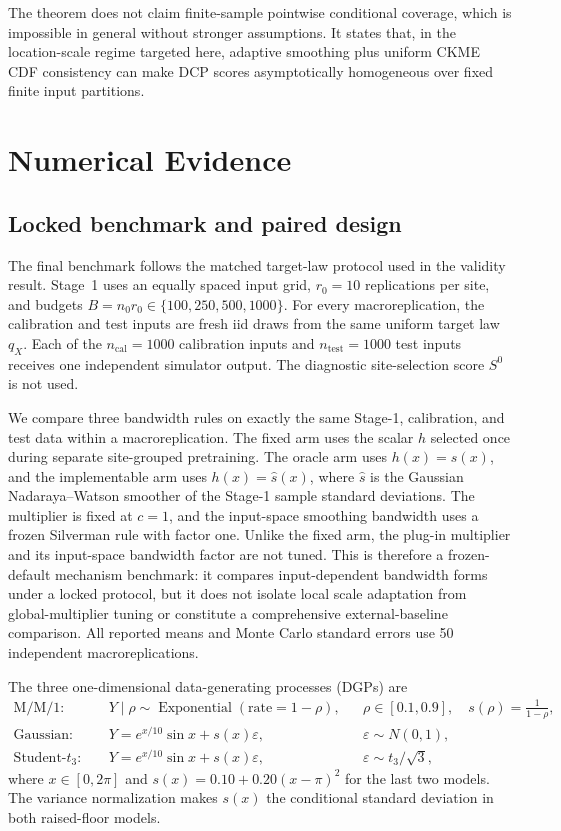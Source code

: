 \documentclass[11pt]{article}
\newif\ifincludeexperiments
\begin{document}
The theorem does not claim finite-sample pointwise conditional coverage, which is impossible in general without stronger assumptions. It states that, in the location-scale regime targeted here, adaptive smoothing plus uniform CKME CDF consistency can make DCP scores asymptotically homogeneous over fixed finite input partitions.

\ifincludeexperiments
\section{Numerical Evidence}
\label{sec:experiments}

\subsection{Locked benchmark and paired design}

The final benchmark follows the matched target-law protocol used in the validity result. Stage~1 uses an equally spaced input grid, \(r_0=10\) replications per site, and budgets \(B=n_0r_0\in\{100,250,500,1000\}\). For every macroreplication, the calibration and test inputs are fresh iid draws from the same uniform target law \(q_X\). Each of the \(n_{\mathrm{cal}}=1000\) calibration inputs and \(n_{\mathrm{test}}=1000\) test inputs receives one independent simulator output. The diagnostic site-selection score \(S^0\) is not used.

We compare three bandwidth rules on exactly the same Stage-1, calibration, and test data within a macroreplication. The fixed arm uses the scalar \(h\) selected once during separate site-grouped pretraining. The oracle arm uses \(h(x)=s(x)\), and the implementable arm uses \(h(x)=\widehat s(x)\), where \(\widehat s\) is the Gaussian Nadaraya--Watson smoother of the Stage-1 sample standard deviations. The multiplier is fixed at \(c=1\), and the input-space smoothing bandwidth uses a frozen Silverman rule with factor one. Unlike the fixed arm, the plug-in multiplier and its input-space bandwidth factor are not tuned. This is therefore a frozen-default mechanism benchmark: it compares input-dependent bandwidth forms under a locked protocol, but it does not isolate local scale adaptation from global-multiplier tuning or constitute a comprehensive external-baseline comparison. All reported means and Monte Carlo standard errors use 50 independent macroreplications.

The three one-dimensional data-generating processes (DGPs) are
\begin{align*}
  \text{M/M/1:}\quad&
  Y\mid \rho\sim\operatorname{Exponential}(\text{rate}=1-\rho),
  &&\rho\in[0.1,0.9],\quad s(\rho)=\frac{1}{1-\rho},\\
  \text{Gaussian:}\quad&
  Y=e^{x/10}\sin x+s(x)\varepsilon,
  &&\varepsilon\sim N(0,1),\\
  \text{Student-}t_3:\quad&
  Y=e^{x/10}\sin x+s(x)\varepsilon,
  &&\varepsilon\sim t_3/\sqrt{3},
\end{align*}
where \(x\in[0,2\pi]\) and \(s(x)=0.10+0.20(x-\pi)^2\) for the last two models. The variance normalization makes \(s(x)\) the conditional standard deviation in both raised-floor models.
\FloatBarrier
\end{document}

